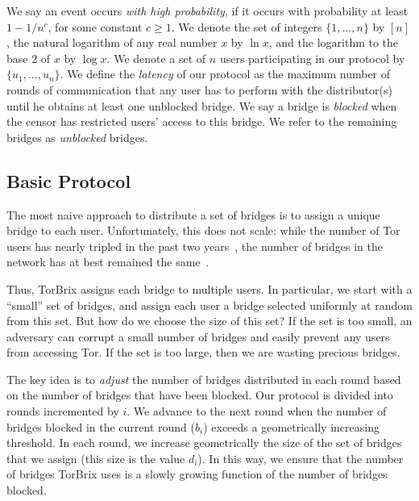 \documentclass[letterpaper,twocolumn,10pt]{article}
\newcommand{\fullpaper}[1]{#1}
\newcommand{\fullpaper}[1]{}
\newcommand{\sfsize}{\fontsize{0.73\baselineskip}{0.73\baselineskip}\selectfont}
\newcommand{\sans}[1]{\textsf{\sfsize \mbox{#1}}}
\newcommand{\brix}{\sans{TorBrix}\xspace}
\begin{document}
We say an event occurs \emph{with high probability}, if it occurs with probability at least \emph{${1-1/n^c}$}, for some constant ${c \geq 1}$. We denote the set of integers ${\{1,...,n\}}$ by $[n]$, the natural logarithm of any real number $x$ by $\ln{x}$, and the logarithm to the base 2 of $x$ by $\log{x}$. We denote a set of $n$ users participating in our protocol by ${\{u_1,...,u_n\}}$. We define the \emph{latency} of our protocol as the maximum number of rounds of communication that any user has to perform with the distributor(s) until he obtains at least one unblocked bridge. \fullpaper{We say a bridge is \emph{blocked} when the censor has restricted users' access to this bridge. We refer to the remaining bridges as \emph{unblocked} bridges.}

\subsection{Basic Protocol} \label{sec:basic-alg}
The most naive approach to distribute a set of bridges is to assign a unique bridge to each user.  Unfortunately, this does not scale: while the number of Tor users has nearly tripled in the past two years~\cite{Tor:BridgeUsers}, the number of bridges in the network has at best remained the same~\cite{Tor:Bridges}. %

Thus, \brix assigns each bridge to multiple users.  In particular, we start with a ``small'' set of bridges, and assign each user a bridge selected uniformly at random from this set.  But how do we choose the size of this set?  If the set is too small, an adversary can corrupt a small number of bridges and easily prevent any users from accessing Tor.  If the set is too large, then we are wasting precious bridges.

The key idea is to \emph{adjust} the number of bridges distributed in each round based on the number of bridges that have been blocked.  Our protocol is divided into rounds incremented by $i$.  We advance to the next round when the number of bridges blocked in the current round ($b_i$) exceeds a geometrically increasing threshold.  In each round, we increase geometrically the size of the set of bridges that we assign (this size is the value $d_i$).  In this way, we ensure that the number of bridges \brix uses is a slowly growing function of the number of bridges blocked.  %
\end{document}
